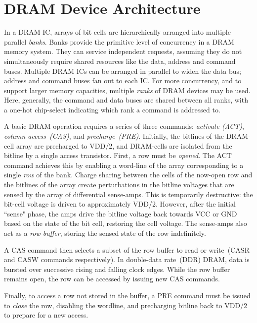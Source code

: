\section{DRAM Device Architecture}\label{sec:dram-arch} In a DRAM IC, arrays of
bit cells are hierarchically arranged into multiple parallel \emph{banks}.
Banks provide the primitive level of concurrency in a DRAM memory system. They
can service independent requests, assuming they do not simultaneously require
shared resources like the data, address and command buses.  Multiple DRAM ICs
can be arranged in parallel to widen the data bus; address and command buses
fan out to each IC. For more concurrency, and to support larger memory
capacities, multiple \emph{ranks} of DRAM devices may be used. Here, generally,
the command and data buses are shared between all ranks, with a one-hot
chip-select indicating which rank a command is addressed to.

A basic DRAM operation requires a series of three commands: \emph{activate
(ACT)}, \emph{column access~(CAS)}, and \emph{precharge~(PRE)}. Initially, the
bitlines of the DRAM-cell array are precharged to VDD/2, and DRAM-cells are
isolated from the bitline by a single access transistor. First, a row must be
\emph{opened}. The ACT command achieves this by enabling a word-line of the
array corresponding to a single \emph{row} of the bank. Charge sharing between
the cells of the now-open row and the bitlines of the array create
perturbations in the bitline voltages that are sensed by the array of
differential sense-amps.  This is temporarily destructive: the bit-cell voltage
is driven to approximately VDD/2. However, after the initial ``sense" phase,
the amps drive the bitline voltage back towards VCC or GND based on the
state of the bit cell, restoring the cell voltage. The
sense-amps also act as a \emph{row buffer}, storing the sensed state of
the row indefinitely.

A CAS command then selects a subset of the row buffer to read or write~(CASR
and CASW commands respectively). In double-data rate~(DDR) DRAM, data is
bursted over successive rising and falling clock edges.  While the row buffer
remains open, the row can be accessed by issuing new CAS commands. 

Finally, to access a row not stored in the buffer, a PRE command must be issued
to \emph{close} the row, disabling the wordline, and precharging bitline back to
VDD/2 to prepare for a new access.

